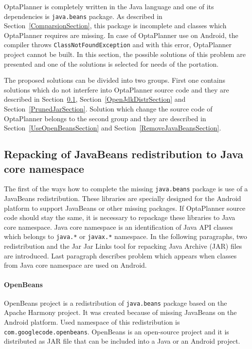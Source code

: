 OptaPlanner is completely written in the Java language and one of its dependencies is \texttt{java.beans} package. As
described in Section~\ref{ComparsionSection}, this package is incomplete and classes which OptaPlanner requires are
missing. In case of OptaPlanner use on Android, the compiler throws \texttt{ClassNotFoundException} and with this error,
OptaPlanner project cannot be built. In this section, the possible solutions of this problem are presented and one of
the solutions is selected for needs of the portation.

The proposed solutions can be divided into two groups. First one contains solutions which do not interfere into
OptaPlanner source code and they are described in Section~\ref{RepackingJavaBeansSection},
Section~\ref{OpenJdkDistrSection} and Section~\ref{PrunedJarSection}. Solution which change the source code of
OptaPlanner belongs to the second group and they are described in Section~\ref{UseOpenBeansSection} and
Section~\ref{RemoveJavaBeansSection}.

\subsection{Repacking of JavaBeans redistribution to Java core namespace}\label{RepackingJavaBeansSection}
The first of the ways how to complete the missing \texttt{java.beans} package is use of a JavaBeans redistribution.
These libraries are specially designed for the Android platform to support JavaBeans or other missing packages. If
OptaPlanner source code should stay the same, it is necessary to repackage these libraries to Java core namespace. Java
core namespace is an identification of Java API classes which belongs to \texttt{java.*} or \texttt{javax.*} namespace.
In the following paragraphs, two redistribution and the Jar Jar Links tool for repacking Java Archive (JAR) files are
introduced. Last paragraph describes problem which appears when classes from Java core namespace are used on Android.

\paragraph{OpenBeans}
OpenBeans project \cite{OpenBeans} is a redistribution of \texttt{java.beans} package based on the Apache Harmony
project. It was created because of missing JavaBeans on the Android platform. Used namespace of this redistribution is
\texttt{com.googlecode.openbeans}. OpenBeans is an open-source project and it is distributed as JAR file that can be
included into a Java or an Android project.

